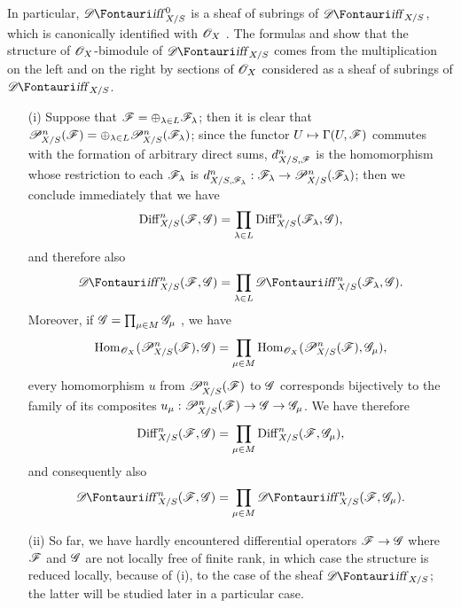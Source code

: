 In particular, $\shDiff_{X/S}^0$ is a sheaf of subrings of $\shDiff_{X/S}$, which is canonically identified with $\mathscr{O}_X$ .
The formulas  and  show that the structure of $\mathscr{O}_X$-bimodule of $\shDiff_{X/S}$ comes from the multiplication on the left and on the right by sections of $\mathscr{O}_X$ considered as a sheaf of subrings of $\shDiff_{X/S}$.

\begin{remarks}[16.8.11]
\label{IV.16.8.11}
\begin{enumerate}
  \item[\rm{(i)}] Suppose that $\mathscr{F} = \oplus_{\lambda \in L} \mathscr{F}_\lambda$;
  then it is clear  that $\mathscr{P}_{X/S}^n(\mathscr{F}) = \oplus_{\lambda \in L} \mathscr{P}_{X/S}^n(\mathscr{F}_\lambda)$;
  since the functor $U \mapsto \Gamma(U, \sh{F})$ commutes with the formation of arbitrary direct sums, $d_{X/S, \mathscr{F}}^n$ is the homomorphism whose restriction to each $\mathscr{F}_\lambda$ is $d_{X/S, \sh{F}_\lambda}^n: \sh{F}_\lambda \to \sh{P}_{X/S}^n(\sh{F}_\lambda)$;
  then we conclude immediately that we have 
  \[
    \operatorname{Diff}_{X/S}^n (\mathscr{F}, \mathscr{G}) = \prod_{\lambda \in L} \operatorname{Diff}_{X/S}^n (\mathscr{F}_\lambda, \mathscr{G}),
  \]
  and therefore also 
  \[
    \shDiff_{X/S}^n (\sh{F}, \sh{G}) = \prod_{\lambda \in L} \shDiff_{X/S}^n (\sh{F}_\lambda, \sh{G}).
  \]
  Moreover, if $\mathscr{G} = \prod_{\mu \in M} \mathscr{G}_\mu$ , we have
  \[
    \operatorname{Hom}_{\mathscr{O}_X}(\mathscr{P}_{X/S}^n(\mathscr{F}), \mathscr{G}) = \prod_{\mu \in M} \operatorname{Hom}_{\mathscr{O}_X}(\mathscr{P}_{X/S}^n(\mathscr{F}), \mathscr{G}_\mu),
  \]
  every homomorphism $u$ from $\mathscr{P}_{X/S}^n(\mathscr{F})$ to $\mathscr{G}$ corresponds bijectively to the family of its composites $u_\mu: \sh{P}_{X/S}^n(\sh{F}) \to \sh{G} \to \sh{G}_\mu$.
  We have therefore
  \[
    \operatorname{Diff}_{X/S}^n(\mathscr{F}, \mathscr{G}) = \prod_{\mu \in M} \operatorname{Diff}_{X/S}^n(\mathscr{F}, \mathscr{G}_\mu),
  \]
  and consequently also
  \[
    \shDiff_{X/S}^n(\sh{F}, \sh{G}) = \prod_{\mu \in M} \shDiff_{X/S}^n(\sh{F}, \sh{G}_\mu).
  \]
  \item[\rm{(ii)}]
  So far, we have hardly encountered differential operators $\sh{F} \to \sh{G}$ where $\mathscr{F}$ and $\mathscr{G}$ are not locally free of finite rank, in which case the structure is reduced locally, because of \rm{(i)}, to the case of the sheaf $\shDiff_{X/S}$;
  the latter will be studied later  in a particular case.
\end{enumerate}
\end{remarks}

